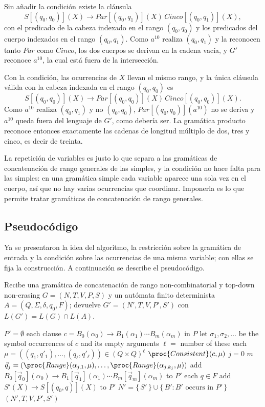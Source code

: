 \documentclass{report}
\theoremstyle{definition}
\theoremstyle{plain}
\theoremstyle{remark}
\begin{document}
Sin añadir la condición existe la cláusula
\[
  S[(q_0, q_0)](X) \to Par[(q_0, q_1)](X)\,Cinco[(q_0, q_1)](X),
\]
con el predicado de la cabeza indexado en el rango $(q_0, q_0)$ y los
predicados del cuerpo indexados en el rango $(q_0, q_1)$.
Como $a^{10}$ realiza $(q_0, q_1)$ y la reconocen tanto $Par$ como
$Cinco$, los dos cuerpos se derivan en la cadena vacía, y $G'$ reconoce
$a^{10}$, la cual está fuera de la intersección.

Con la condición, las ocurrencias de $X$ llevan el mismo rango, y la
única cláusula válida con la cabeza indexada en el rango $(q_0, q_0)$ es
\[
  S[(q_0, q_0)](X) \to Par[(q_0, q_0)](X)\,Cinco[(q_0, q_0)](X).
\]
Como
$a^{10}$ realiza $(q_0, q_1)$ y no $(q_0, q_0)$,
$Par[(q_0, q_0)](a^{10})$ no se deriva y $a^{10}$ queda fuera del
lenguaje de $G'$, como debería ser. La gramática producto reconoce
entonces exactamente las cadenas de longitud múltiplo de dos, tres y
cinco, es decir de treinta.

La repetición de variables es justo lo que separa a las gramáticas de
concatenación de rango generales de las simples, y la condición no
hace falta para las simples: en una gramática simple
cada variable aparece una sola vez en el cuerpo, así que no hay varias
ocurrencias que coordinar. Imponerla es lo que permite tratar
gramáticas de concatenación de rango generales.

\subsection{Pseudocódigo}

Ya se presentaron la idea del algoritmo, la restricción sobre la
gramática de entrada y la condición sobre las ocurrencias de una misma
variable; con ellas se fija la construcción. A continuación se describe
el pseudocódigo.

Recibe una gramática de concatenación de rango non-combinatorial y
top-down non-erasing $G = (N, T, V, P, S)$ y un autómata finito determinista
$A = (Q, \Sigma, \delta, q_0, F)$; devuelve $G' = (N', T, V, P', S')$
con $L(G') = L(G) \cap L(A)$.

\begin{codebox}
\li $P' = \emptyset$
\li \For each clause $c = B_0(\alpha_0) \to B_1(\alpha_1) \cdots B_m(\alpha_m)$ in $P$
\li \Do
        let $\sigma_1, \sigma_2, \ldots$ be the symbol occurrences of $c$ and its empty arguments
\li     $\ell = $ number of these
\li     \For each $\mu = ((q_1, q'_1), \ldots, (q_\ell, q'_\ell)) \in (Q \times Q)^\ell$
\li     \Do
            \If $\proc{Consistent}(c, \mu)$
\li         \Then
                \For $j = 0$ \To $m$
\li             \Do
                    $\vec{q}_j = (\proc{Range}(\alpha_{j,1}, \mu), \ldots, \proc{Range}(\alpha_{j,k_j}, \mu))$
                \End
\li             add $B_0[\vec{q}_0](\alpha_0) \to B_1[\vec{q}_1](\alpha_1) \cdots B_m[\vec{q}_m](\alpha_m)$ to $P'$
            \End
        \End
    \End
\li \For each $q \in F$
\li \Do
        add $S'(X) \to S[(q_0, q)](X)$ to $P'$
    \End
\li $N' = \{\, S' \,\} \cup \{\, B' : B' \text{ occurs in } P' \,\}$
\li \Return $(N', T, V, P', S')$
\end{codebox}
\end{document}
